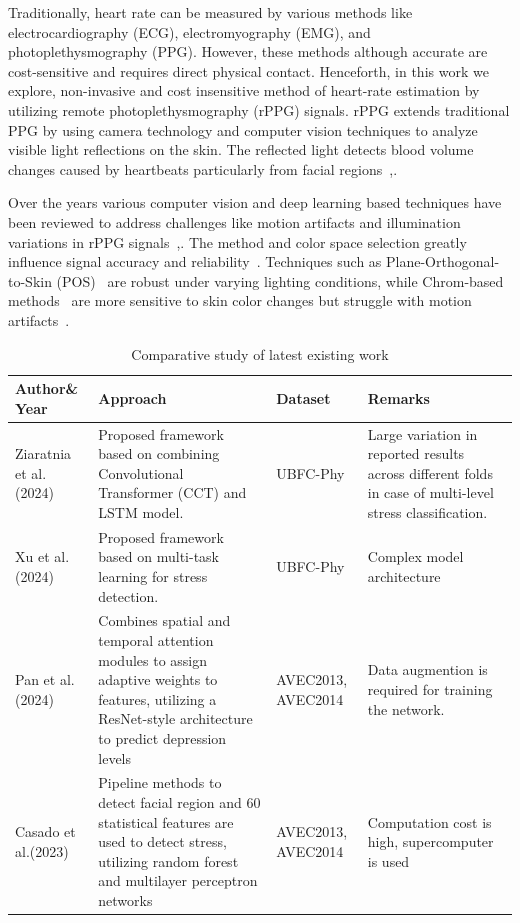     Traditionally, heart rate can be measured by various methods like electrocardiography (ECG), electromyography (EMG), and  photoplethysmography (PPG). However, these methods although accurate are cost-sensitive and requires direct physical contact. Henceforth, in this work we explore, non-invasive and cost insensitive method of heart-rate estimation by utilizing remote photoplethysmography (rPPG) signals.
rPPG extends traditional PPG by using camera technology and computer vision techniques to analyze visible light reflections on the skin. The reflected light detects blood volume changes caused by heartbeats  particularly from facial regions~\cite{speth2024mspm},\cite{mironenko2020remote}.

Over the years various computer vision and deep learning  based techniques have been reviewed to address challenges like motion artifacts and illumination variations in rPPG signals~\cite{lee2024review},\cite{wong2022optimising}. The method and color space selection greatly influence signal accuracy and reliability~\cite{zhao2024toward}. Techniques such as Plane-Orthogonal-to-Skin (POS)~\cite{lee2024review} are robust under varying lighting conditions, while Chrom-based methods~\cite{lee2024review} are more sensitive to skin color changes but  struggle with motion artifacts~\cite{pirzada2023remote}.

\begin{table}[!h]
    \centering
    \caption{Comparative study of latest existing work}
    \begin{tabular}{p{3cm} p{4cm} p{2cm} p{5cm}} %
        \toprule
        \textbf{Author\& Year} & \textbf{Approach} & \textbf{Dataset} & \textbf{Remarks} \\ 
        \midrule
        Ziaratnia et al.(2024)\cite{ziaratnia2024multimodal} & Proposed framework based on combining Convolutional Transformer (CCT) and LSTM model. & UBFC-Phy & Large variation in reported results across different folds in case of multi-level stress classification.\\

        Xu et al.(2024)\cite{xu2024facial} & Proposed framework based on multi-task learning for stress detection.  & UBFC-Phy & Complex model architecture\\
        
        Pan et al.(2024)\cite{pan2024spatial} &Combines spatial and temporal attention modules to assign adaptive weights to features, utilizing a ResNet-style architecture to predict depression levels & AVEC2013, AVEC2014 & Data augmention is required for training the network. \\
        
        Casado et al.(2023)\cite{casado2023depression} & Pipeline methods to detect facial region and 60 statistical features are used to detect stress, utilizing random forest and multilayer perceptron networks & AVEC2013, AVEC2014 & Computation cost is high, supercomputer is used \\

        
        \bottomrule
    \end{tabular}
\end{table}

